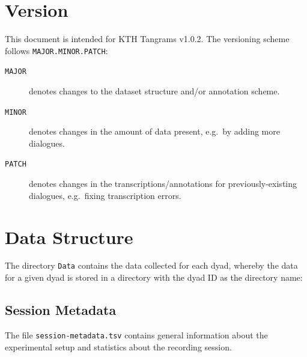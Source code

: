 \documentclass[USenglish]{article}
\newcommand{\inlinecode}[1]{\texttt{#1}}	%
\newcommand{\corpusname}{KTH Tangrams}
\newcommand{\corpusversion}{\mbox{v1.0.2}}
\begin{document}
\section{Version}

This document is intended for \corpusname{} \corpusversion{}. The versioning scheme follows \inlinecode{MAJOR.MINOR.PATCH}:

\begin{description}
	\item[\inlinecode{MAJOR}] denotes changes to the dataset structure and\slash{}or annotation scheme.
	\item[\inlinecode{MINOR}] denotes changes in the amount of data present, e.g.\ by adding more dialogues.
	\item[\inlinecode{PATCH}] denotes changes in the transcriptions\slash{}annotations for previously-existing dialogues, e.g.\ fixing transcription errors.
\end{description}

\section{Data Structure}

The directory \inlinecode{Data} contains the data collected for each dyad, whereby the data for a given dyad is stored in a directory with the dyad ID as the directory name:


\subsection{Session Metadata}

The file \inlinecode{session-metadata.tsv} contains general information about the experimental setup and statistics about the recording session.
\end{document}
